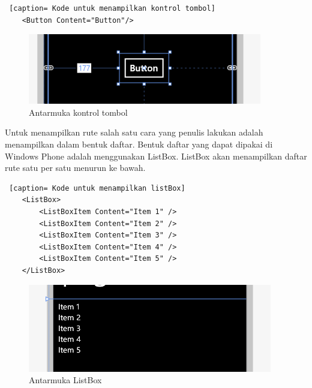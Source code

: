 \begin{lstlisting} [caption= Kode untuk menampilkan kontrol tombol]
	<Button Content="Button"/>
\end{lstlisting}

\begin{figure}[h]
	\centering
		\includegraphics[scale=0.5]{Gambar/kontrol/button.PNG}
	\caption{Antarmuka kontrol tombol}
	\label{fig:antarmuka Kontrol tombol}
\end{figure}

\hspace{0.5cm} Untuk menampilkan rute salah satu cara yang penulis lakukan adalah menampilkan dalam bentuk daftar. Bentuk daftar yang dapat dipakai di Windows Phone adalah menggunakan ListBox. ListBox akan menampilkan daftar rute satu per satu menurun ke bawah.

\begin{lstlisting} [caption= Kode untuk menampilkan listBox]
	<ListBox>
		<ListBoxItem Content="Item 1" />
		<ListBoxItem Content="Item 2" />
		<ListBoxItem Content="Item 3" />
		<ListBoxItem Content="Item 4" />
		<ListBoxItem Content="Item 5" />
	</ListBox>
\end{lstlisting}

\begin{figure}[h]
	\centering
		\includegraphics[scale=0.4]{Gambar/kontrol/listBox.PNG}
	\caption{Antarmuka ListBox}
	\label{fig:antarmuka ListBox}
\end{figure}

